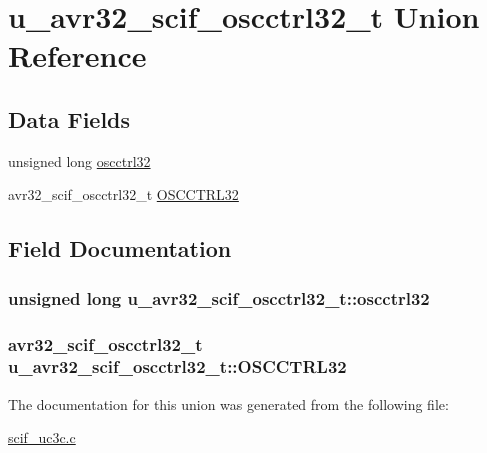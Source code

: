 \hypertarget{unionu__avr32__scif__oscctrl32__t}{
\section{u\-\_\-avr32\-\_\-scif\-\_\-oscctrl32\-\_\-t \-Union \-Reference}
\label{unionu__avr32__scif__oscctrl32__t}
}
\subsection*{\-Data \-Fields}
\begin{DoxyCompactItemize}
\item 
unsigned long \hyperlink{unionu__avr32__scif__oscctrl32__t_a29f7f13d957ead97f8a3e4707c676e98}{oscctrl32}
\item 
avr32\-\_\-scif\-\_\-oscctrl32\-\_\-t \hyperlink{unionu__avr32__scif__oscctrl32__t_a9272a4e5c4da7e51c36d36dc497b9a7b}{\-O\-S\-C\-C\-T\-R\-L32}
\end{DoxyCompactItemize}


\subsection{\-Field \-Documentation}
\hypertarget{unionu__avr32__scif__oscctrl32__t_a29f7f13d957ead97f8a3e4707c676e98}{
\subsubsection[{oscctrl32}]{\setlength{\rightskip}{0pt plus 5cm}unsigned long {\bf u\-\_\-avr32\-\_\-scif\-\_\-oscctrl32\-\_\-t\-::oscctrl32}}}
\label{unionu__avr32__scif__oscctrl32__t_a29f7f13d957ead97f8a3e4707c676e98}
\hypertarget{unionu__avr32__scif__oscctrl32__t_a9272a4e5c4da7e51c36d36dc497b9a7b}{
\subsubsection[{\-O\-S\-C\-C\-T\-R\-L32}]{\setlength{\rightskip}{0pt plus 5cm}avr32\-\_\-scif\-\_\-oscctrl32\-\_\-t {\bf u\-\_\-avr32\-\_\-scif\-\_\-oscctrl32\-\_\-t\-::\-O\-S\-C\-C\-T\-R\-L32}}}
\label{unionu__avr32__scif__oscctrl32__t_a9272a4e5c4da7e51c36d36dc497b9a7b}


\-The documentation for this union was generated from the following file\-:\begin{DoxyCompactItemize}
\item 
\hyperlink{scif__uc3c_8c}{scif\-\_\-uc3c.\-c}\end{DoxyCompactItemize}
